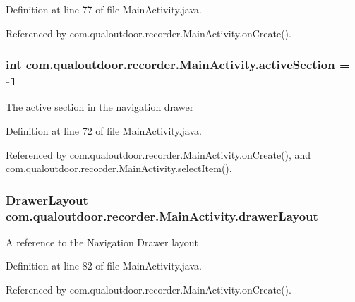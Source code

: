 Definition at line 77 of file Main\-Activity.\-java.



Referenced by com.\-qualoutdoor.\-recorder.\-Main\-Activity.\-on\-Create().

\hypertarget{classcom_1_1qualoutdoor_1_1recorder_1_1MainActivity_a198488a2b8d8f4d8d9b9f63939fd4dff}{
\subsubsection[{active\-Section}]{\setlength{\rightskip}{0pt plus 5cm}int com.\-qualoutdoor.\-recorder.\-Main\-Activity.\-active\-Section = -\/1\hspace{0.3cm}{\ttfamily [private]}}}\label{classcom_1_1qualoutdoor_1_1recorder_1_1MainActivity_a198488a2b8d8f4d8d9b9f63939fd4dff}
The active section in the navigation drawer 

Definition at line 72 of file Main\-Activity.\-java.



Referenced by com.\-qualoutdoor.\-recorder.\-Main\-Activity.\-on\-Create(), and com.\-qualoutdoor.\-recorder.\-Main\-Activity.\-select\-Item().

\hypertarget{classcom_1_1qualoutdoor_1_1recorder_1_1MainActivity_ad37318bd3bb05942c955bc0ccc90935d}{
\subsubsection[{drawer\-Layout}]{\setlength{\rightskip}{0pt plus 5cm}Drawer\-Layout com.\-qualoutdoor.\-recorder.\-Main\-Activity.\-drawer\-Layout\hspace{0.3cm}{\ttfamily [private]}}}\label{classcom_1_1qualoutdoor_1_1recorder_1_1MainActivity_ad37318bd3bb05942c955bc0ccc90935d}
A reference to the Navigation Drawer layout 

Definition at line 82 of file Main\-Activity.\-java.



Referenced by com.\-qualoutdoor.\-recorder.\-Main\-Activity.\-on\-Create().

